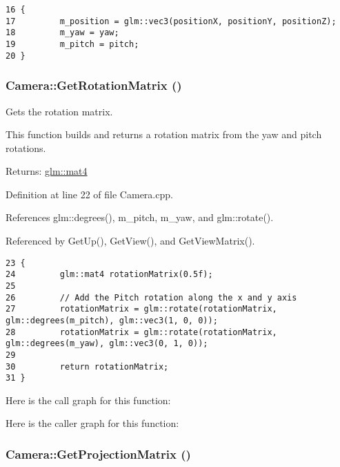 \begin{Code}\begin{verbatim}16 {
17         m_position = glm::vec3(positionX, positionY, positionZ);
18         m_yaw = yaw;
19         m_pitch = pitch;
20 }
\end{verbatim}
\end{Code}


\hypertarget{class_camera_3518233b244af839db6eefe59e7002de}{
\subsubsection[GetRotationMatrix]{ Camera::GetRotationMatrix ()}}
\label{class_camera_3518233b244af839db6eefe59e7002de}


Gets the rotation matrix. 

This function builds and returns a rotation matrix from the yaw and pitch rotations.

\begin{Desc}
\item[Returns:]\hyperlink{group__core__types_g7dcd2365c2e368e6af5b7adeb6a9c8df}{glm::mat4} \end{Desc}


Definition at line 22 of file Camera.cpp.

References glm::degrees(), m\_\-pitch, m\_\-yaw, and glm::rotate().

Referenced by GetUp(), GetView(), and GetViewMatrix().

\begin{Code}\begin{verbatim}23 {
24         glm::mat4 rotationMatrix(0.5f);
25 
26         // Add the Pitch rotation along the x and y axis
27         rotationMatrix = glm::rotate(rotationMatrix, glm::degrees(m_pitch), glm::vec3(1, 0, 0));
28         rotationMatrix = glm::rotate(rotationMatrix, glm::degrees(m_yaw), glm::vec3(0, 1, 0));
29 
30         return rotationMatrix;
31 }
\end{verbatim}
\end{Code}




Here is the call graph for this function:

Here is the caller graph for this function:\hypertarget{class_camera_b0a4bf5a65d45f25529e3cffda1c361b}{
\subsubsection[GetProjectionMatrix]{ Camera::GetProjectionMatrix ()}}
\label{class_camera_b0a4bf5a65d45f25529e3cffda1c361b}


